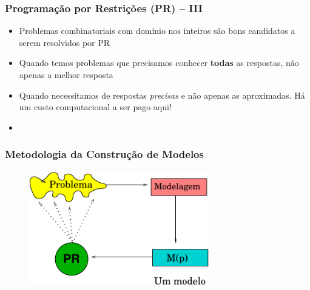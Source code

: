 \begin{frame}[fragile]
\frametitle{Programação por Restrições (PR) -- III}

   \begin{block}{}
     \begin{itemize}
    \item Problemas combinatoriais com domínio nos inteiros são bons candidatos a serem
       resolvidos por PR
       \pause
       \item Quando temos problemas que precisamos conhecer \textbf{todas} as respostas, 
    não apenas a melhor resposta
    
      \pause
      \item Quando necessitamos de respostas \textit{precisas} e não apenas as aproximadas.
       Há um custo  computacional a ser pago aqui!
        
        \pause
        \item



    \end{itemize}
    \end{block}
    
\end{frame}



\begin{frame}[fragile]

\frametitle{Metodologia da  Construção de Modelos}

\begin{figure}[ht!]
\begin{center}

\includegraphics[width=0.70\textwidth, height=0.60\textheight]{figures/problema_modelagem.pdf}

\end{center}
\end{figure}


    
\end{frame}


